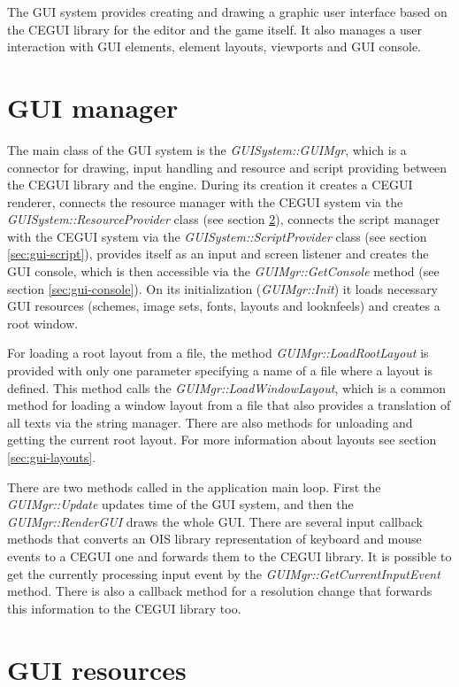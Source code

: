 \documentclass[a4paper, 12pt]{report}
\begin{document}
The GUI system provides creating and drawing a graphic user interface based on the CEGUI library for the editor and the game itself. It also manages a user interaction with GUI elements, element layouts, viewports and GUI console.

\section{GUI manager}

The main class of the GUI system is the \emph{GUISystem::GUIMgr}, which is a connector for drawing, input handling and resource and script providing between the CEGUI library and the engine. During its creation it creates a CEGUI renderer, connects the resource manager with the CEGUI system via the \emph{GUISystem::Resource\-Provider} class (see section \ref{sec:gui-resources}), connects the script manager with the CEGUI system via the \emph{GUISystem::ScriptProvider} class (see section \ref{sec:gui-script}), provides itself as an input and screen listener and creates the GUI console, which is then accessible via the \emph{GUIMgr::GetConsole} method (see section \ref{sec:gui-console}). On its initialization (\emph{GUIMgr::Init}) it loads necessary GUI resources (schemes, image sets, fonts, layouts and looknfeels) and creates a root window.

For loading a root layout from a file, the method \emph{GUIMgr::LoadRootLayout} is provided with only one parameter specifying a name of a file where a layout is defined. This method calls the \emph{GUIMgr::LoadWindowLayout}, which is a common method for loading a window layout from a file that also provides a translation of all texts via the string manager. There are also methods for unloading and getting the current root layout. For more information about layouts see section \ref{sec:gui-layouts}.

There are two methods called in the application main loop. First the \emph{GUIMgr::Update} updates time of the GUI system, and then the \emph{GUIMgr::\-Render\-GUI} draws the whole GUI. There are several input callback methods that converts an OIS library representation of keyboard and mouse events to a CEGUI one and forwards them to the CEGUI library. It is possible to get the currently processing input event by the \emph{GUIMgr::GetCurrentInputEvent} method. There is also a callback method for a resolution change that forwards this information to the CEGUI library too.

\section{GUI resources}
\label{sec:gui-resources}
\end{document}
